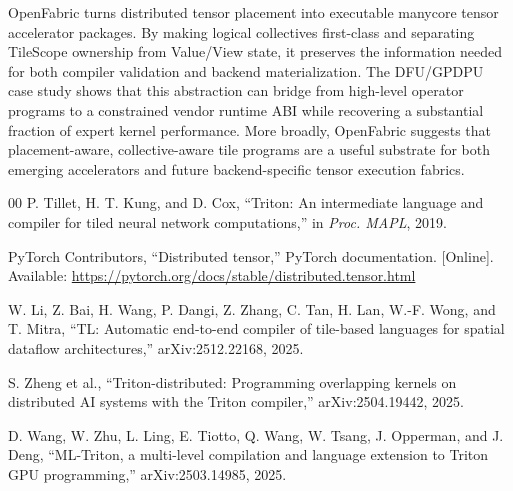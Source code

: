 \documentclass[conference]{IEEEtran}
\newcommand{\systemname}{OpenFabric}
\newcommand{\targetbackend}{DFU/GPDPU}
\begin{document}
\systemname{} turns distributed tensor placement into executable manycore tensor
accelerator packages. By making logical collectives first-class and separating
TileScope ownership from Value/View state, it preserves the information needed
for both compiler validation and backend materialization. The \targetbackend{}
case study shows that this abstraction can bridge from high-level operator
programs to a constrained vendor runtime ABI while recovering a substantial
fraction of expert kernel performance. More broadly, \systemname{} suggests that
placement-aware, collective-aware tile programs are a useful substrate for both
emerging accelerators and future backend-specific tensor execution fabrics.

\begin{thebibliography}{00}
P. Tillet, H. T. Kung, and D. Cox, ``Triton: An intermediate language and
compiler for tiled neural network computations,'' in \textit{Proc. MAPL}, 2019.

PyTorch Contributors, ``Distributed tensor,'' PyTorch documentation. [Online].
Available: \url{https://pytorch.org/docs/stable/distributed.tensor.html}

W. Li, Z. Bai, H. Wang, P. Dangi, Z. Zhang, C. Tan, H. Lan, W.-F. Wong, and
T. Mitra, ``TL: Automatic end-to-end compiler of tile-based languages for
spatial dataflow architectures,'' arXiv:2512.22168, 2025.

S. Zheng et al., ``Triton-distributed: Programming overlapping kernels on
distributed AI systems with the Triton compiler,'' arXiv:2504.19442, 2025.

D. Wang, W. Zhu, L. Ling, E. Tiotto, Q. Wang, W. Tsang, J. Opperman, and
J. Deng, ``ML-Triton, a multi-level compilation and language extension to
Triton GPU programming,'' arXiv:2503.14985, 2025.
\end{thebibliography}
\end{document}
